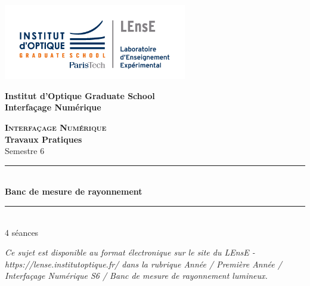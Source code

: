 \documentclass[a4paper,11pt,titlepage]{article} %
\begin{document}
\begin{titlepage}

\begin{center}
	\begin{minipage}{2.5cm}
	\begin{center}
		\includegraphics[width=8cm]{images/Logo-LEnsE.png}
	\end{center}
\end{minipage}\hfill
\begin{minipage}{10cm}
	\begin{center}
	\textbf{Institut d'Optique Graduate School }\\[0.1cm]
    \textbf{Interfaçage Numérique}


	\end{center}
\end{minipage}\hfill


\vspace{4cm}


{\huge \bfseries \textsc{Interfaçage Numérique}} \\[0.5cm]
{\large \bfseries Travaux Pratiques} \\[0.2cm]
Semestre 6

\vspace{2cm}
\rule{\linewidth}{0.3mm} \\[0.4cm]
{ \huge \bfseries\color{violet_iogs} Banc de mesure de rayonnement \\[0.4cm] }
\rule{\linewidth}{0.3mm} \\[1cm]

4 séances

\bigskip

\begin{center}
\end{center}

\vfill

\textit{Ce sujet est disponible au format électronique sur le site du LEnsE - https://lense.institutoptique.fr/ dans la rubrique Année / Première Année / Interfaçage Numérique S6 / Banc de mesure de rayonnement lumineux.}


\end{center}
\end{titlepage}
\end{document}
